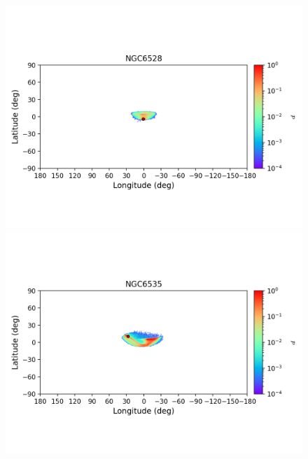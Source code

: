\begin{figure}
\begin{center}
                \includegraphics[clip=true, trim = 0mm 20mm 0mm 10mm, width=1\columnwidth]{images/error_plots_NGC6528.png}
                \includegraphics[clip=true, trim = 0mm 20mm 0mm 10mm, width=1\columnwidth]{images/error_plots_NGC6535.png}
                

\end{center}
\end{figure}
